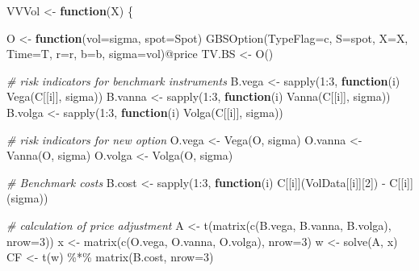 \documentclass[]{tufte-book}
\newenvironment{Shaded}{}{}
\newcommand{\AttributeTok}[1]{\textcolor[rgb]{0.49,0.56,0.16}{#1}}
\newcommand{\CommentTok}[1]{\textcolor[rgb]{0.38,0.63,0.69}{\textit{#1}}}
\newcommand{\ControlFlowTok}[1]{\textcolor[rgb]{0.00,0.44,0.13}{\textbf{#1}}}
\newcommand{\DecValTok}[1]{\textcolor[rgb]{0.25,0.63,0.44}{#1}}
\newcommand{\FunctionTok}[1]{\textcolor[rgb]{0.02,0.16,0.49}{#1}}
\newcommand{\NormalTok}[1]{#1}
\newcommand{\OtherTok}[1]{\textcolor[rgb]{0.00,0.44,0.13}{#1}}
\newcommand{\SpecialCharTok}[1]{\textcolor[rgb]{0.25,0.44,0.63}{#1}}
\newcommand{\StringTok}[1]{\textcolor[rgb]{0.25,0.44,0.63}{#1}}
\begin{document}
\begin{Shaded}
\begin{Highlighting}[]
\NormalTok{  VVVol }\OtherTok{\textless{}{-}} \ControlFlowTok{function}\NormalTok{(X) \{}

\NormalTok{  O }\OtherTok{\textless{}{-}} \ControlFlowTok{function}\NormalTok{(}\AttributeTok{vol=}\NormalTok{sigma, }\AttributeTok{spot=}\NormalTok{Spot) }\FunctionTok{GBSOption}\NormalTok{(}\AttributeTok{TypeFlag=}\StringTok{\textquotesingle{}c\textquotesingle{}}\NormalTok{, }\AttributeTok{S=}\NormalTok{spot,}
         \AttributeTok{X=}\NormalTok{X, }\AttributeTok{Time=}\NormalTok{T, }\AttributeTok{r=}\NormalTok{r, }\AttributeTok{b=}\NormalTok{b, }\AttributeTok{sigma=}\NormalTok{vol)}\SpecialCharTok{@}\NormalTok{price}
\NormalTok{  TV.BS }\OtherTok{\textless{}{-}} \FunctionTok{O}\NormalTok{()}

  \CommentTok{\# risk indicators for benchmark instruments}
\NormalTok{  B.vega }\OtherTok{\textless{}{-}} \FunctionTok{sapply}\NormalTok{(}\DecValTok{1}\SpecialCharTok{:}\DecValTok{3}\NormalTok{, }\ControlFlowTok{function}\NormalTok{(i) }\FunctionTok{Vega}\NormalTok{(C[[i]], sigma))}
\NormalTok{  B.vanna }\OtherTok{\textless{}{-}} \FunctionTok{sapply}\NormalTok{(}\DecValTok{1}\SpecialCharTok{:}\DecValTok{3}\NormalTok{, }\ControlFlowTok{function}\NormalTok{(i) }\FunctionTok{Vanna}\NormalTok{(C[[i]], sigma))}
\NormalTok{  B.volga }\OtherTok{\textless{}{-}} \FunctionTok{sapply}\NormalTok{(}\DecValTok{1}\SpecialCharTok{:}\DecValTok{3}\NormalTok{, }\ControlFlowTok{function}\NormalTok{(i) }\FunctionTok{Volga}\NormalTok{(C[[i]], sigma))}

  \CommentTok{\# risk indicators for new option}
\NormalTok{  O.vega }\OtherTok{\textless{}{-}} \FunctionTok{Vega}\NormalTok{(O, sigma)}
\NormalTok{  O.vanna }\OtherTok{\textless{}{-}} \FunctionTok{Vanna}\NormalTok{(O, sigma)}
\NormalTok{  O.volga }\OtherTok{\textless{}{-}} \FunctionTok{Volga}\NormalTok{(O, sigma)}

  \CommentTok{\# Benchmark costs}
\NormalTok{  B.cost }\OtherTok{\textless{}{-}} \FunctionTok{sapply}\NormalTok{(}\DecValTok{1}\SpecialCharTok{:}\DecValTok{3}\NormalTok{, }\ControlFlowTok{function}\NormalTok{(i) C[[i]](VolData[[i]][}\DecValTok{2}\NormalTok{]) }\SpecialCharTok{{-}}\NormalTok{ C[[i]](sigma))}

  \CommentTok{\# calculation of price adjustment}
\NormalTok{  A }\OtherTok{\textless{}{-}} \FunctionTok{t}\NormalTok{(}\FunctionTok{matrix}\NormalTok{(}\FunctionTok{c}\NormalTok{(B.vega, B.vanna, B.volga),  }\AttributeTok{nrow=}\DecValTok{3}\NormalTok{))}
\NormalTok{  x }\OtherTok{\textless{}{-}} \FunctionTok{matrix}\NormalTok{(}\FunctionTok{c}\NormalTok{(O.vega, O.vanna, O.volga), }\AttributeTok{nrow=}\DecValTok{3}\NormalTok{)}
\NormalTok{  w }\OtherTok{\textless{}{-}} \FunctionTok{solve}\NormalTok{(A, x)}
\NormalTok{  CF }\OtherTok{\textless{}{-}} \FunctionTok{t}\NormalTok{(w) }\SpecialCharTok{\%*\%} \FunctionTok{matrix}\NormalTok{(B.cost, }\AttributeTok{nrow=}\DecValTok{3}\NormalTok{)}


\end{Highlighting}
\end{Shaded}
\end{document}
